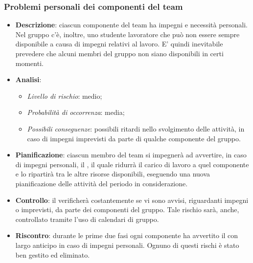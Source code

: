 		\subsubsection{Problemi personali dei componenti del team}
			\begin{itemize}
				\item \textbf{Descrizione}: ciascun componente del team ha impegni e necessità personali. Nel gruppo c'è, inoltre, uno studente lavoratore che può non essere sempre disponibile a causa di impegni relativi al lavoro. E' quindi inevitabile prevedere che alcuni membri del gruppo non siano disponibili in certi momenti.
				\item \textbf{Analisi}:
				\begin{itemize}
					\item \textit{Livello di rischio}: medio;
					\item \textit{Probabilità di occorrenza}: media;
					\item \textit{Possibili conseguenze}: possibili ritardi nello svolgimento delle attività, in caso di impegni imprevisti da parte di qualche componente del gruppo.
				\end{itemize}
				\item \textbf{Pianificazione}: ciascun membro del team si impegnerà ad avvertire, in caso di impegni personali, il , il quale ridurrà il carico di lavoro a quel componente e lo ripartirà tra le altre risorse disponibili, eseguendo una nuova pianificazione delle attività del periodo in considerazione.
				\item \textbf{Controllo}: il  verificherà costantemente se vi sono avvisi, riguardanti impegni o imprevisti, da parte dei componenti del gruppo. Tale rischio sarà, anche, controllato tramite l'uso di calendari di gruppo.
				\item \textbf{Riscontro}: durante le prime due fasi ogni componente ha avvertito il  con largo  anticipo in caso di impegni personali. Ognuno di questi rischi è stato ben gestito ed eliminato.
			\end{itemize}
